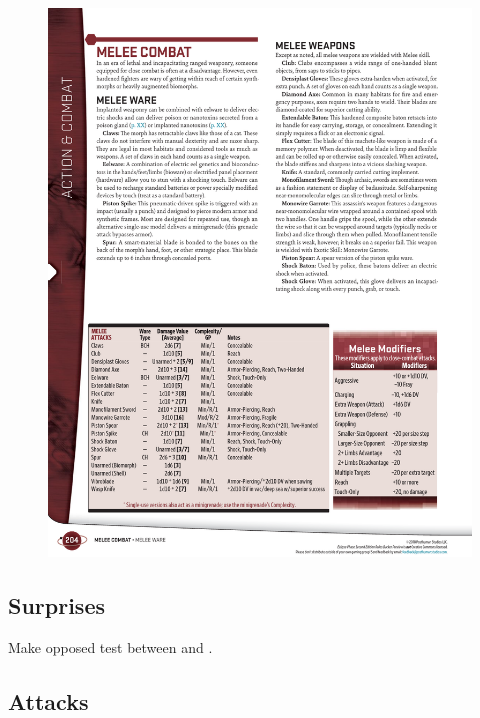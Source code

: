 
\begin{figure}[h!]%
   \includegraphics[scale=0.95]{gfx/combat-melee-modifiers}%
\end{figure}%



\subsection*{Surprises}

\begin{itemize}
    \itembox Make opposed test between  and .
\end{itemize}


\subsection*{Attacks}


